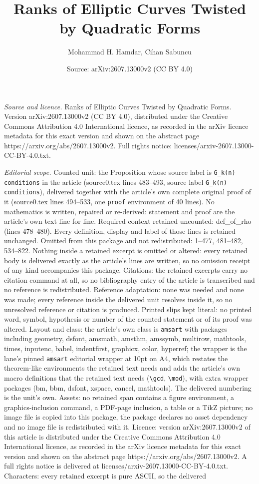 \documentclass[10pt,a4paper]{amsart}
\title[Ranks of Elliptic Curves Twisted by Quadratic Forms]{Ranks of Elliptic Curves Twisted by Quadratic Forms}
\author{Mohammad H. Hamdar, Cihan Sabuncu}
\date{Source: arXiv:2607.13000v2 (CC BY 4.0)}
\begin{document}
\maketitle

\noindent\emph{Source and licence.} Ranks of Elliptic Curves Twisted by Quadratic Forms. Version arXiv:2607.13000v2 (CC BY 4.0), distributed under the Creative Commons Attribution 4.0 International licence, as recorded in the arXiv licence metadata for this exact version and shown on the abstract page https://arxiv.org/abs/2607.13000v2. Full rights notice: licenses/arxiv-2607.13000-CC-BY-4.0.txt.\par\smallskip

\noindent\textit{Editorial scope.} Counted unit: the Proposition whose source label is \texttt{G\_k(n) conditions} in the article (source0.tex lines 483--493, source label \texttt{G\_k(n) conditions}), delivered together with the article's own complete original proof of it (source0.tex lines 494--533, one \texttt{proof} environment of 40 lines). No mathematics is written, repaired or re-derived: statement and proof are the article's own text line for line. Required context retained uncounted: def\_of\_rho (lines 478--480). Every definition, display and label of those lines is retained unchanged. Omitted from this package and not redistributed: 1--477, 481--482, 534--822. Nothing inside a retained excerpt is omitted or altered: every retained body is delivered exactly as the article's lines are written, so no omission receipt of any kind accompanies this package. Citations: the retained excerpts carry no citation command at all, so no bibliography entry of the article is transcribed and no reference is redistributed. Reference adaptation: none was needed and none was made; every reference inside the delivered unit resolves inside it, so no unresolved reference or citation is produced. Printed slips kept literal: no printed word, symbol, hypothesis or number of the counted statement or of its proof was altered. Layout and class: the article's own class is \texttt{amsart} with packages including geometry, dsfont, amsmath, amsthm, amssymb, multirow, mathtools, times, inputenc, babel, indentfirst, graphicx, color, hyperref; the wrapper is the lane's pinned \texttt{amsart} editorial wrapper at 10pt on A4, which restates the theorem-like environments the retained text needs and adds the article's own macro definitions that the retained text needs (\texttt{\textbackslash gcd}, \texttt{\textbackslash mod}), with extra wrapper packages (bm, bbm, dsfont, xspace, cancel, mathtools). The delivered numbering is the unit's own. Assets: no retained span contains a figure environment, a graphics-inclusion command, a PDF-page inclusion, a table or a TikZ picture; no image file is copied into this package, the package declares no asset dependency and no image file is redistributed with it. Licence: version arXiv:2607.13000v2 of this article is distributed under the Creative Commons Attribution 4.0 International licence, as recorded in the arXiv licence metadata for this exact version and shown on the abstract page https://arxiv.org/abs/2607.13000v2. A full rights notice is delivered at licenses/arxiv-2607.13000-CC-BY-4.0.txt. Characters: every retained excerpt is pure ASCII, so the delivered 
\end{document}
